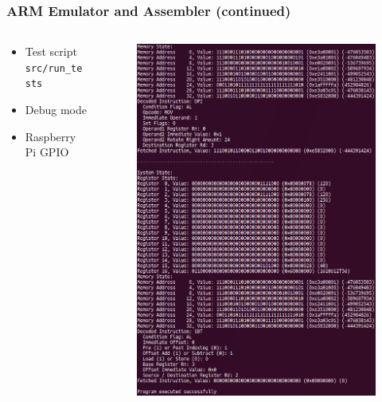 \documentclass{beamer}
\begin{document}
\begin{frame}
	\frametitle{ARM Emulator and Assembler (continued)}
	\begin{columns}
		\begin{column}{0.5\textwidth}
			\begin{itemize}
				\item Test script \texttt{src/run\_tests}
				\item Debug mode
				\item Raspberry Pi GPIO
			\end{itemize}
		\end{column}
		\begin{column}{0.5\textwidth}
			\begin{figure}
				\includegraphics[width=\columnwidth-\columnsep]{Presentation/emulate.png}
			\end{figure}
		\end{column}
	\end{columns}
\end{frame}
\end{document}
